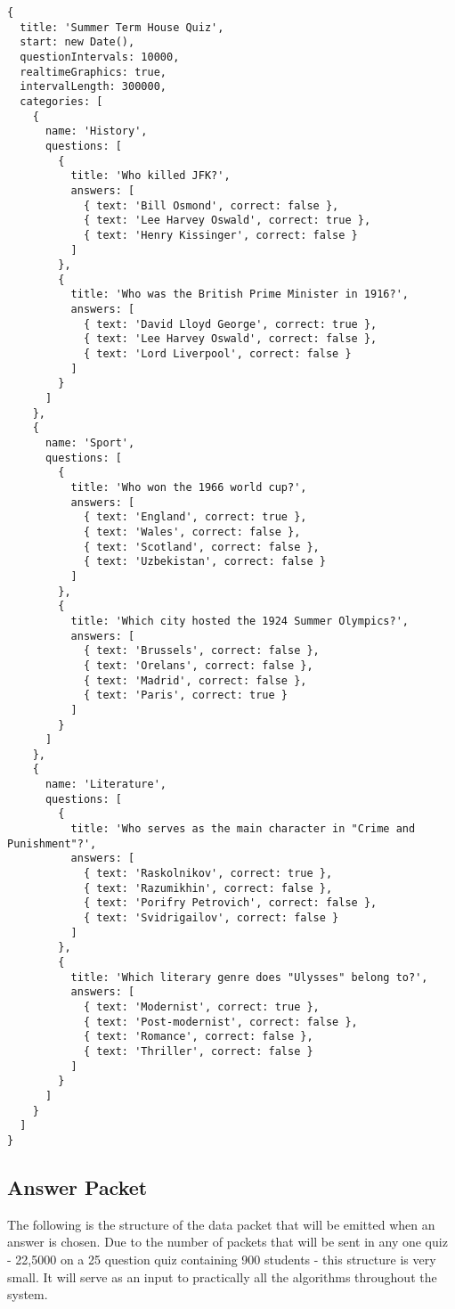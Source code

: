 \begin{Verbatim}[fontsize=\small]
{
  title: 'Summer Term House Quiz',
  start: new Date(),
  questionIntervals: 10000,
  realtimeGraphics: true,
  intervalLength: 300000,
  categories: [
    {
      name: 'History',
      questions: [
        {
          title: 'Who killed JFK?',
          answers: [
            { text: 'Bill Osmond', correct: false },
            { text: 'Lee Harvey Oswald', correct: true },
            { text: 'Henry Kissinger', correct: false }
          ]
        },
        {
          title: 'Who was the British Prime Minister in 1916?',
          answers: [
            { text: 'David Lloyd George', correct: true },
            { text: 'Lee Harvey Oswald', correct: false },
            { text: 'Lord Liverpool', correct: false }
          ]
        }
      ]
    },
    {
      name: 'Sport',
      questions: [
        {
          title: 'Who won the 1966 world cup?',
          answers: [
            { text: 'England', correct: true },
            { text: 'Wales', correct: false },
            { text: 'Scotland', correct: false },
            { text: 'Uzbekistan', correct: false }
          ]
        },
        {
          title: 'Which city hosted the 1924 Summer Olympics?',
          answers: [
            { text: 'Brussels', correct: false },
            { text: 'Orelans', correct: false },
            { text: 'Madrid', correct: false },
            { text: 'Paris', correct: true }
          ]
        }
      ]
    },
    {
      name: 'Literature',
      questions: [
        {
          title: 'Who serves as the main character in "Crime and Punishment"?',
          answers: [
            { text: 'Raskolnikov', correct: true },
            { text: 'Razumikhin', correct: false },
            { text: 'Porifry Petrovich', correct: false },
            { text: 'Svidrigailov', correct: false }
          ]
        },
        {
          title: 'Which literary genre does "Ulysses" belong to?',
          answers: [
            { text: 'Modernist', correct: true },
            { text: 'Post-modernist', correct: false },
            { text: 'Romance', correct: false },
            { text: 'Thriller', correct: false }
          ]
        }
      ]
    }
  ]
}
\end{Verbatim}

\subsection{Answer Packet}
The following is the structure of the data packet that will be emitted when an answer is chosen. Due to the number of packets that will be sent in any one quiz - 22,5000 on a 25 question quiz containing 900 students - this structure is very small. It will serve as an input to practically all the algorithms throughout the system.

